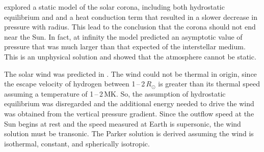 \citet{Chapman:1957} explored a static model of the solar corona, including both hydrostatic equilibrium and and a heat conduction term that resulted in a slower decrease in pressure with radius. This lead to the conclusion that the corona should not end near the Sun. In fact, at infinity the model predicted an asymptotic value of pressure that was much larger than that expected of the interstellar medium. This is an unphysical solution and showed that the atmosphere cannot be static.

The solar wind was predicted in \cite{Parker:1958}. The wind could not be thermal in origin, since the escape velocity of hydrogen between 1\,--\,2\,$R_{\odot}$ is greater than its thermal speed assuming a temperature of 1\,--\,2\,MK. So, the assumption of hydrostatic equilibrium was disregarded and the additional energy needed to drive the wind was obtained from the vertical pressure gradient. Since the outflow speed at the Sun begins at rest and the speed measured at Earth is supersonic, the wind solution must be transonic. The Parker solution is derived assuming the wind is isothermal, constant, and spherically isotropic.

